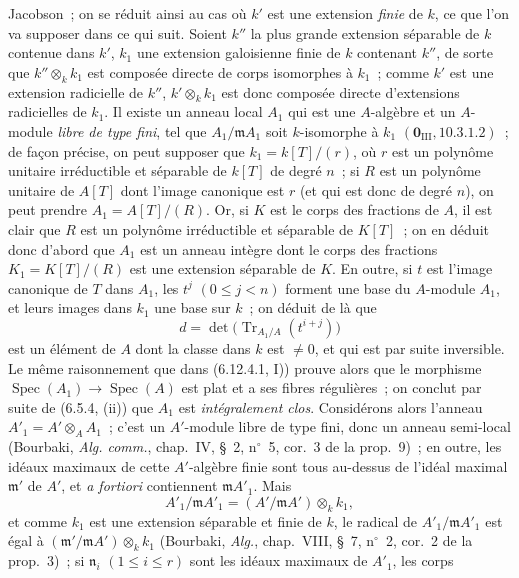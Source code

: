 
Jacobson~; on se réduit ainsi au cas où $k'$ est une extension \emph{finie} de
$k$, ce que l'on va supposer dans ce qui suit. Soient $k''$ la plus grande
extension séparable de $k$ contenue dans $k'$, $k_1$ une extension galoisienne
finie de $k$ contenant $k''$, de sorte que $k''\otimes_k k_1$ est composée
directe de corps isomorphes à $k_1$~; comme $k'$ est une extension radicielle de
$k''$, $k'\otimes_k k_1$ est donc composée directe d'extensions radicielles de
$k_1$. Il existe un anneau local $A_1$ qui est une $A$-algèbre et un $A$-module
\emph{libre de type fini}, tel que $A_1/\mathfrak m A_1$ soit $k$-isomorphe à
$k_1$ $(\mathbf 0_{\mathrm{III}},10.3.1.2)$~; de façon précise, on peut supposer
que $k_1=k[T]/(r)$, où $r$ est un polynôme unitaire irréductible et séparable de
$k[T]$ de degré $n$~; si $R$ est un polynôme unitaire de $A[T]$ dont l'image
canonique est $r$ (et qui est donc de degré $n$), on peut prendre
$A_1=A[T]/(R)$. Or, si $K$ est le corps des fractions de $A$, il est clair que
$R$ est un polynôme irréductible et séparable de $K[T]$~; on en déduit donc
d'abord que $A_1$ est un anneau intègre dont le corps des fractions
$K_1=K[T]/(R)$ est une extension séparable de $K$. En outre, si $t$ est l'image
canonique de $T$ dans $A_1$, les $t^j$ $(0\leq j<n)$ forment une base du
$A$-module $A_1$, et leurs images dans $k_1$ une base sur $k$~; on déduit de là
que
\[
d=\det\bigl(\operatorname{Tr}_{A_1/A}(t^{i+j})\bigr)
\]
est un élément de $A$ dont la classe dans $k$ est $\ne0$, et qui est par suite
inversible. Le même raisonnement que dans (6.12.4.1, I)) prouve alors que le
morphisme $\operatorname{Spec}(A_1)\to\operatorname{Spec}(A)$ est plat et a ses
fibres régulières~; on conclut par suite de (6.5.4, (ii)) que $A_1$ est
\emph{intégralement clos}. Considérons alors l'anneau
$A'_1=A'\otimes_A A_1$~; c'est un $A'$-module libre de type fini, donc un anneau
semi-local (Bourbaki, \emph{Alg. comm.}, chap.~IV, \S~2, n$^\circ$~5, cor.~3 de
la prop.~9)~; en outre, les idéaux maximaux de cette $A'$-algèbre finie sont
tous au-dessus de l'idéal maximal $\mathfrak m'$ de $A'$, et \emph{a fortiori}
contiennent $\mathfrak m A'_1$. Mais
\[
A'_1/\mathfrak m A'_1=(A'/\mathfrak m A')\otimes_k k_1,
\]
et comme $k_1$ est une extension séparable et finie de $k$, le radical de
$A'_1/\mathfrak m A'_1$ est égal à
$(\mathfrak m'/\mathfrak m A')\otimes_k k_1$ (Bourbaki, \emph{Alg.},
chap.~VIII, \S~7, n$^\circ$~2, cor.~2 de la prop.~3)~; si $\mathfrak n_i$
$(1\leq i\leq r)$ sont les idéaux maximaux de $A'_1$, les corps
